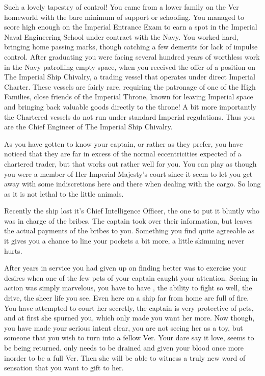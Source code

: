 \documentclass[char]{guildcamp4}
\begin{document}
\name{\cVtwo{}}


Such a lovely tapestry of control! 
You came from a lower family on the Ver homeworld with the bare minimum of support or schooling. You managed to score high enough on the Imperial Entrance Exam to earn a spot in the Imperial Naval Engineering School under contract with the Navy. You worked hard, bringing home passing marks, though catching a few demerits for lack of impulse control. After graduating you were facing  several hundred years of worthless work in the Navy patrolling empty space, when you received the offer of a position on The Imperial Ship Chivalry, a trading vessel that operates under direct Imperial Charter. These vessels are fairly rare, requiring the patronage of one of the High Families, close friends of the Imperial Throne, known for leaving Imperial space and bringing back valuable goods directly to the throne! A bit more importantly the Chartered vessels do not run under standard Imperial regulations. Thus you are the Chief Engineer of The Imperial Ship Chivalry. 

As you have gotten to know your captain, or rather \cVone{\Duke} as they prefer, you have noticed that they are far in excess of the normal eccentricities expected of a chartered trader, but that works out rather well for you. You can play as though you were a member of Her Imperial Majesty's court since it seem to let you get away with some indiscretions here and there when dealing with the cargo. So long as it is not lethal to the little animals. 

Recently the ship lost it's Chief Intelligence Officer, the one to put it bluntly who was in charge of the bribes. The captain took over their information, but leaves the actual payments of the bribes to you. Something you find quite agreeable as it gives you a chance to line your pockets a bit more, a little skimming never hurts.

After years in \cVone{\their} service you had given up on finding better was to exercise your desires when one of the few pets of your captain caught your attention. Seeing  \cJulie{} in action was simply marvelous, you have to have \cJulie{\them}, the ability to fight so well, the drive, the sheer life you see. Even here on a ship far from home \cJulie{\they} are full of fire. You have attempted to court her secretly, the captain is very protective of  pets, and at first she spurned you, which only made you want her more. Now though, you have made your serious intent clear, you are not seeing her as a toy, but someone that you wish to turn into a fellow Ver. Your dare say it love, seems to be being returned. \cJulie{} only needs to be drained and given your blood once more inorder to be a full Ver. Then she will be able to witness a truly new word of sensation that you want to gift to her.
\end{document}
